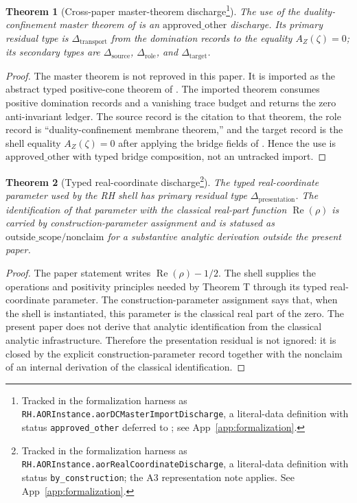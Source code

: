 \documentclass[11pt]{article}
\DeclareMathOperator{\Real}{Re}
\newcommand{\AZ}{A_{Z}(\zeta)}
\newtheorem{theorem}{Theorem}[section]
\theoremstyle{definition}
\begin{document}
\begin{theorem}[Cross-paper master-theorem discharge\footnote{Tracked in the formalization harness as \nolinkurl{RH.AORInstance.aorDCMasterImportDischarge}, a literal-data definition with status \texttt{approved\_other} deferred to \cite{TsiokosSDTC2026}; see App~\ref{app:formalization}.}]
\label{thm:rh:aor-dc-master-import-discharge}
The use of the duality-confinement master theorem of
\citet{TsiokosSDTC2026} is an
\(\mathrm{approved\_other}\) discharge.  Its primary residual type is
\(\Delta_{\mathrm{transport}}\) from the domination records to the
equality \(\AZ=0\); its secondary types are
\(\Delta_{\mathrm{source}}\), \(\Delta_{\mathrm{role}}\), and
\(\Delta_{\mathrm{target}}\).
\end{theorem}

\begin{proof}
The master theorem is not reproved in this paper.  It is imported as
the abstract typed positive-cone theorem of \citet{TsiokosSDTC2026}.
The imported theorem consumes positive domination records and a
vanishing trace budget and returns the zero anti-invariant ledger.
The source record is the citation to that theorem, the role record is
``duality-confinement membrane theorem,'' and the target record is the
shell equality \(\AZ=0\) after applying the bridge fields of
.  Hence the use is
\(\mathrm{approved\_other}\) with typed bridge composition, not an
untracked import.
\end{proof}

\begin{theorem}[Typed real-coordinate discharge\footnote{Tracked in the formalization harness as \nolinkurl{RH.AORInstance.aorRealCoordinateDischarge}, a literal-data definition with status \texttt{by\_construction}; the A3 representation note applies. See App~\ref{app:formalization}.}]
\label{thm:rh:aor-real-coordinate-discharge}
The typed real-coordinate parameter used by the RH shell has primary
residual type \(\Delta_{\mathrm{presentation}}\).  The identification
of that parameter with the classical real-part function
\(\Real(\rho)\) is carried by construction-parameter assignment and is
statused as \(\mathrm{outside\_scope}/\mathrm{nonclaim}\) for a
substantive analytic derivation outside the present paper.
\end{theorem}

\begin{proof}
The paper statement writes \(\Real(\rho)-1/2\).  The shell supplies the
operations and positivity principles needed by Theorem T through its
typed real-coordinate parameter.  The construction-parameter assignment
says that, when the shell is instantiated, this parameter is the
classical real part of the zero.  The present paper does not derive
that analytic identification from the classical analytic infrastructure.
Therefore the
presentation residual is not ignored: it is closed by the explicit
construction-parameter record together with the nonclaim of an
internal derivation of the classical identification.
\end{proof}
\end{document}
